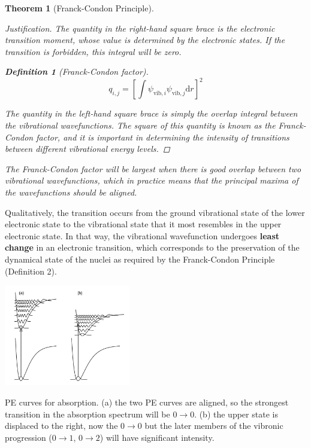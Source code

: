 \documentclass[a4paper]{tufte-handout}
\newtheorem{theorem}{Theorem}
\newenvironment{justification} {\begin{proof}[Justification]} {\end{proof}}
\theoremstyle{definition}
\newtheorem{definition}{Definition}
\begin{document}
\begin{theorem}[Franck-Condon Principle]
\begin{justification}
    The quantity in the right-hand square brace is the electronic 
    transition moment, whose value is determined by the electronic states. If the transition is forbidden, this integral will be zero.

    \begin{definition}[Franck-Condon factor]
      \begin{equation*}
        q_{i,j} = \left[ \int\psi_{\mathrm{vib},i} \psi_{\mathrm{vib,}j}\mathrm{d}r  \right]^2
      \end{equation*}
      
    \end{definition}

    The quantity in the left-hand square brace is simply the \textit{overlap integral} between the vibrational wavefunctions. The square of this quantity is known 
    as the Franck-Condon factor, and it is important in determining the intensity of transitions between different vibrational energy levels.

   

  \end{justification}

  The Franck-Condon factor will be largest when there is good overlap between two vibrational wavefunctions, which in practice means that the principal maxima
  of the wavefunctions should be aligned.
  
\end{theorem}

Qualitatively, the transition occurs from the ground vibrational state of the lower electronic state to the vibrational state 
that it most resembles in the upper electronic state. In that way, the vibrational wavefunction undergoes \textbf{least change} in an electronic transition, 
which corresponds to the preservation of the dynamical state of the nuclei as required by the Franck-Condon Principle (Definition 2).

\begin{marginfigure}
  \includegraphics[width=55mm]{fcprinciple.png}
  \caption{PE curves for absorption. (a) the two PE curves are aligned, so the strongest transition in the absorption spectrum will be $0 \rightarrow 0$. (b)
  the upper state is displaced to the right, now the $0 \rightarrow 0$ but the later members of the vibronic progression ($0 \rightarrow 1$, $0 \rightarrow 2$) will have significant intensity.} 
\end{marginfigure}
\end{document}

